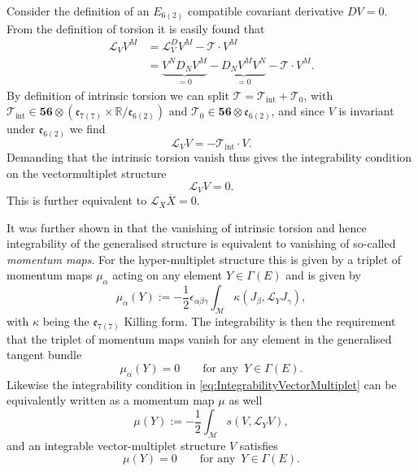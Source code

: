 Consider the definition of an $E_{6(2)}$ compatible covariant derivative $DV=0$. From the definition of torsion it is easily found that 
\begin{equation}
    \begin{aligned}
    \mathscr{L}_VV^M &= \mathscr{L}^D_VV^M-\mathscr{T}\cdot V^M\\
                    &= \underbrace{V^ND_NV^M}_{=0}-\underbrace{D_NV^MV^N}_{=0}-\mathscr{T}\cdot V^M.
    \end{aligned}
\end{equation}
By definition of intrinsic torsion we can split $\mathscr{T}=\mathscr{T}_{\text{int}}+\mathscr{T}_0$, with $\mathscr{T}_{\text{int}}\in \mathbf{56}\otimes (\mathfrak{e}_{7(7)}\times\mathbb{R}/\mathfrak{e}_{6(2)})$ and $\mathscr{T}_0\in \mathbf{56}\otimes\mathfrak{e}_{6(2)}$, and since $V$ is invariant under $\mathfrak{e}_{6(2)}$ we find 
\begin{equation}
    \mathscr{L}_V V = -\mathscr{T}_{\text{int}}\cdot V.
\end{equation}
Demanding that the intrinsic torsion vanish thus gives the integrability condition on the vectormultiplet structure 
\begin{equation}\label{eq:IntegrabilityVectorMultiplet}
    \mathscr{L}_V V = 0.
\end{equation}
This is further equivalent to $\mathscr{L}_X\overbar{X}=0$. 

It was further shown in \cite{Ashmore:2015joa} that the vanishing of intrinsic torsion and hence integrability of the generalised structure is equivalent to vanishing of so-called \emph{momentum maps}. For the hyper-multiplet structure this is given by a triplet of momentum maps $\mu_\alpha$ acting on any element $Y\in\Gamma(E)$ and is given by 
\begin{equation}
    \mu_\alpha(Y):= -\frac{1}{2}\epsilon_{\alpha\beta\gamma}\int_\mathcal{M}\kappa(J_\beta,\mathscr{L}_YJ_\gamma),
\end{equation}
with $\kappa$ being the $\mathfrak{e}_{7(7)}$ Killing form. The integrability is then the requirement that the triplet of momentum maps vanish for any element in the generalised tangent bundle
\begin{equation}
    \mu_\alpha(Y) = 0\qquad \text{for any }\, Y\in\Gamma(E).
\end{equation}
Likewise the integrability condition in \eqref{eq:IntegrabilityVectorMultiplet} can be equivalently written as a momentum map $\mu$ as well
\begin{equation}
    \mu(Y) := -\frac{1}{2}\int_\mathcal{M}s(V,\mathscr{L}_YV),
\end{equation}
and an integrable vector-multiplet structure $V$ satisfies 
\begin{equation}
    \mu(Y) = 0\qquad \text{for any }\, Y\in\Gamma(E).
\end{equation}

